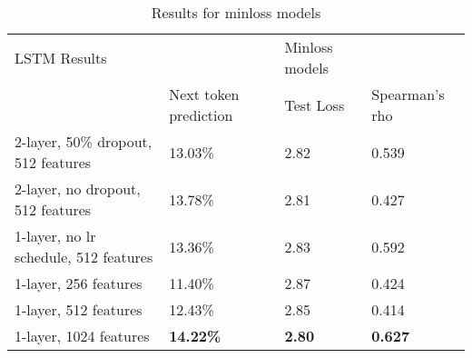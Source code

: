 \begin{table}[!ht]
  \centering
\begin{tabular}{|l|lll|}
\hline
LSTM Results                          &                                                     & Minloss models                     &                \\ \cline{2-4}
                                      & \multicolumn{1}{l|}{Next token prediction}          & \multicolumn{1}{l|}{Test Loss}     & Spearman's rho \\ \hline
2-layer, 50\% dropout, 512 features   & \multicolumn{1}{l|}{13.03\%}                        & \multicolumn{1}{l|}{2.82}          & 0.539          \\ \hline
2-layer, no dropout, 512 features     & \multicolumn{1}{l|}{13.78\%}                        & \multicolumn{1}{l|}{2.81}          & 0.427          \\ \hline
1-layer, no lr schedule, 512 features & \multicolumn{1}{l|}{13.36\%}                        & \multicolumn{1}{l|}{2.83}          & 0.592          \\ \hline
1-layer, 256 features                 & \multicolumn{1}{l|}{11.40\%}                        & \multicolumn{1}{l|}{2.87}          & 0.424          \\ \hline
1-layer, 512 features                 & \multicolumn{1}{l|}{12.43\%}                        & \multicolumn{1}{l|}{2.85}          & 0.414          \\ \hline
1-layer, 1024 features                & \multicolumn{1}{l|}{\textbf{14.22\%}}               & \multicolumn{1}{l|}{\textbf{2.80}} & \textbf{0.627} \\ \hline
\end{tabular}
\caption{Results for minloss models}
\label{tab:minloss}
\end{table}
